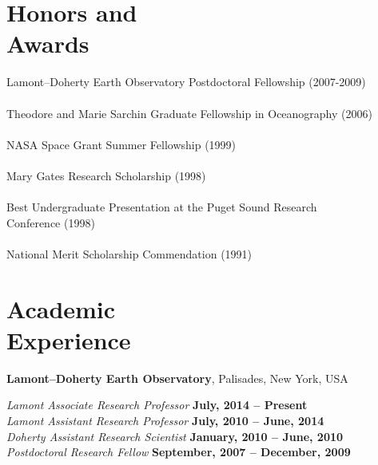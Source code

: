 \documentclass[11pt]{res}
\begin{document}
\begin{resume}
\section{\sc Honors and\\Awards} 

Lamont--Doherty Earth Observatory Postdoctoral Fellowship (2007-2009) \\
\vspace*{0.5mm}\\
Theodore and Marie Sarchin Graduate Fellowship in Oceanography (2006) \\
\vspace*{0.5mm}\\
NASA Space Grant Summer Fellowship (1999) \\
\vspace*{0.5mm}\\
Mary Gates Research Scholarship (1998) \\
\vspace*{0.5mm}\\
Best Undergraduate Presentation at the Puget Sound Research \\ Conference (1998) \\
\vspace*{0.5mm}\\
National Merit Scholarship Commendation (1991) \\

\section{\sc Academic\\Experience}

{\bf Lamont--Doherty Earth Observatory}, Palisades, New York, USA

{\em Lamont Associate Research Professor} \hfill {\bf July, 2014 -- Present}\\

\vspace{-.3cm}
{\em Lamont Assistant Research Professor} \hfill {\bf July, 2010 -- June, 2014}\\

\vspace{-.3cm}
{\em Doherty Assistant Research Scientist} \hfill {\bf January, 2010 -- June, 2010}\\

\vspace{-.3cm}
{\em Postdoctoral Research Fellow} \hfill {\bf September, 2007 -- December, 2009}\\


\end{resume}
\end{document}
